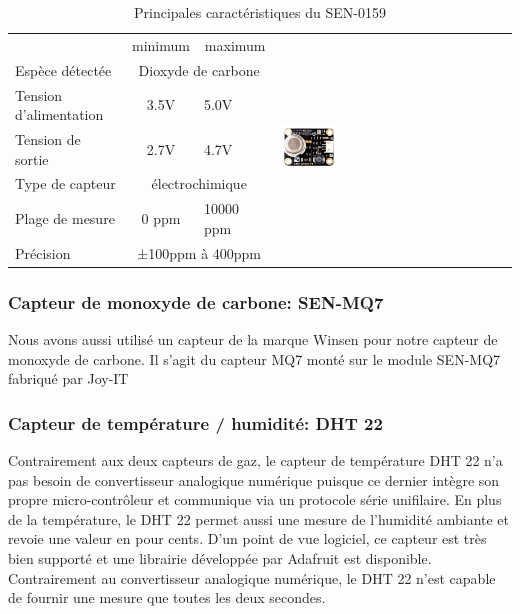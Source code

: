 \documentclass[a4paper]{report}
\begin{document}
\begin{table}[]
\centering
\begin{tabular}{|l|cl|l|}
\hline
\multicolumn{1}{|c|}{} & \multicolumn{1}{c|}{minimum} & \multicolumn{1}{c|}{maximum} & \multirow{7}{*}{\includegraphics[width=0.25\textwidth]{sen0159}} \\ \cline{1-3}
Espèce détectée        & \multicolumn{2}{c|}{Dioxyde de carbone} &  \\ \cline{1-3}
Tension d'alimentation & \multicolumn{1}{c|}{3.5V}   & 5.0V      &  \\ \cline{1-3}
Tension de sortie      & \multicolumn{1}{c|}{2.7V}   & 4.7V      &  \\ \cline{1-3}
Type de capteur        & \multicolumn{2}{c|}{électrochimique}    &  \\ \cline{1-3}
Plage de mesure        & \multicolumn{1}{c|}{0 ppm}  & 10000 ppm &  \\ \cline{1-3}
Précision              & \multicolumn{2}{c|}{±100ppm à 400ppm}   &  \\ \hline
\end{tabular}
\caption{Principales caractéristiques du SEN-0159}
\label{tab:SEN0159}
\end{table}

\subsubsection{Capteur de monoxyde de carbone: SEN-MQ7}
	Nous avons aussi utilisé un capteur de la marque Winsen pour notre capteur de monoxyde de carbone. Il s'agit du capteur MQ7 monté sur le module SEN-MQ7 fabriqué par Joy-IT
\subsubsection{Capteur de température / humidité: DHT 22}
	Contrairement aux deux capteurs de gaz, le capteur de température DHT 22 n'a pas besoin de convertisseur analogique numérique puisque ce dernier intègre son propre micro-contrôleur et communique via un protocole série unifilaire. En plus de la température, le DHT 22 permet aussi une mesure de l'humidité ambiante et revoie une valeur en pour cents. D'un point de vue logiciel, ce capteur est très bien supporté et une librairie développée par Adafruit est disponible. Contrairement au convertisseur analogique numérique, le DHT 22 n'est capable de fournir une mesure que toutes les deux secondes.
	
\end{document}
